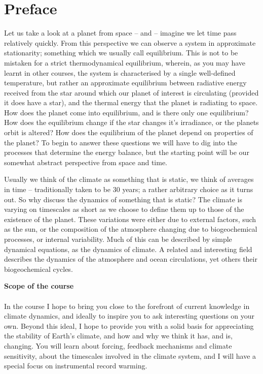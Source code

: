 \documentclass[12pt]{book}
\title{\DocTitle}
\author{Thorsten Mauritsen}
\date{\today}
\begin{document}
 
\maketitle
\tableofcontents



\frontmatter
{}
\chapter{Preface}
Let us take a look at a planet from space -- and -- imagine we let time pass relatively quickly. From this perspective we can observe a system in approximate stationarity; something which we usually call equilibrium. This is not to be mistaken for a strict thermodynamical equilibrium, wherein, as you may have learnt in other courses, the system is characterised by a single well-defined temperature, but rather an approximate equilibrium between radiative energy received from the star around which our planet of interest is circulating (provided it does have a star), and the thermal energy that the planet is radiating to space. How does the planet come into equilibrium, and is there only one equilibrium? How does the equilibrium change if the star changes it's irradiance, or the planets orbit is altered? How does the equilibrium of the planet depend on properties of the planet? To begin to answer these questions we will have to dig into the processes that determine the energy balance, but the starting point will be our somewhat abstract perspective from space and time.

Usually we think of the climate as something that is static, we think of averages in time -- traditionally taken to be 30 years; a rather arbitrary choice as it turns out. So why discuss the dynamics of something that is static? The climate is varying on timescales as short as we choose to define them up to those of the existence of the planet. These variations were either due to external factors, such as the sun, or  the composition of the atmosphere changing due to biogeochemical processes, or internal variability. Much of this can be described by simple dynamical equations, as the dynamics of climate. A related and interesting field describes the dynamics of the atmosphere and ocean circulations, yet others their biogeochemical cycles. 

\vspace{1.0 cm}
\noindent
{\bf \LARGE Scope of the course}
\\
\\
\noindent In the course I hope to bring you close to the forefront of current knowledge in climate dynamics, and ideally to inspire you to ask interesting questions on your own. Beyond this ideal, I hope to provide you with a solid basis for appreciating the stability of Earth's climate, and how and why we think it has, and is, changing. You will learn about forcing, feedback mechanisms and climate sensitivity, about the timescales involved in the climate system, and I will have a special focus on instrumental record warming. 
\end{document}
